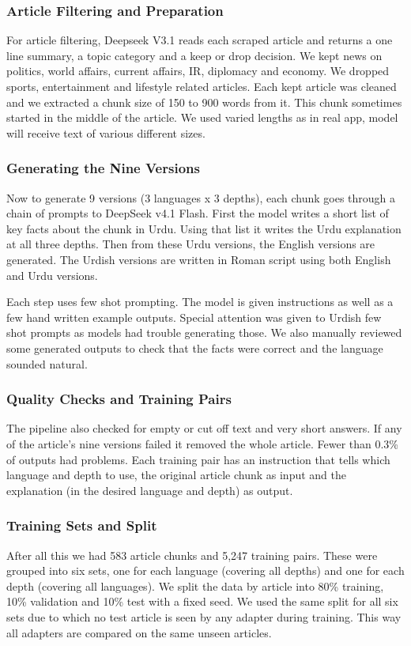\documentclass{FastFyp}
\begin{document}
\subsubsection{Article Filtering and Preparation}
For article filtering, Deepseek V3.1 reads each scraped article and returns a one line summary, a topic category and a keep or drop decision. We kept news on politics, world affairs, current affairs, IR, diplomacy and economy. We dropped sports, entertainment and lifestyle related articles. Each kept article was cleaned and we extracted a chunk size of 150 to 900 words from it. This chunk sometimes started in the middle of the article. We used varied lengths as in real app, model will receive text of various different sizes. 

\subsubsection{Generating the Nine Versions}
Now to generate 9 versions (3 languages x 3 depths), each chunk goes through a chain of prompts to DeepSeek v4.1 Flash. First the model writes a short list of key facts about the chunk in Urdu. Using that list it writes the Urdu explanation at all three depths. Then from these Urdu versions, the English versions are generated. The Urdish versions are written in Roman script using both English and Urdu versions. 

Each step uses few shot prompting. The model is given instructions as well as a few hand written example outputs. Special attention was given to Urdish few shot prompts as models had trouble generating those. We also manually reviewed some generated outputs to check that the facts were correct and the language sounded natural.

\subsubsection{Quality Checks and Training Pairs}
The pipeline also checked for empty or cut off text and very short answers. If any of the article’s nine versions failed it removed the whole article. Fewer than 0.3\% of outputs had problems. Each training pair has an instruction that tells which language and depth to use, the original article chunk as input and the explanation (in the desired language and depth) as output.

\subsubsection{Training Sets and Split}
After all this we had 583 article chunks and 5,247 training pairs. These were grouped into six sets, one for each language (covering all depths) and one for each depth (covering all languages). We split the data by article into 80\% training, 10\% validation and 10\% test with a fixed seed. We used the same split for all six sets due to which no test article is seen by any adapter during training. This way all adapters are compared on the same unseen articles. 
\end{document}
